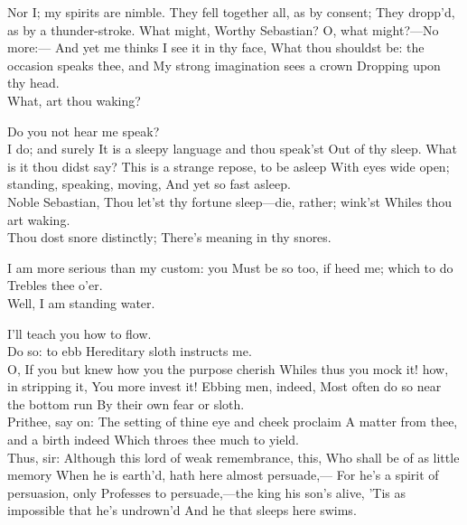\documentclass[11pt]{book}
\begin{document}
\7	Nor I; my spirits are nimble.
	They fell together all, as by consent;
	They dropp'd, as by a thunder-stroke. What might,
	Worthy Sebastian? O, what might?---No more:---
	And yet me thinks I see it in thy face,
	What thou shouldst be: the occasion speaks thee, and
	My strong imagination sees a crown
	Dropping upon thy head. \\

\8	What, art thou waking?

\7	Do you not hear me speak? \\

\8	I do; and surely
	It is a sleepy language and thou speak'st
	Out of thy sleep. What is it thou didst say?
	This is a strange repose, to be asleep
	With eyes wide open; standing, speaking, moving,
	And yet so fast asleep. \\

\7	Noble Sebastian,
	Thou let'st thy fortune sleep---die, rather; wink'st
	Whiles thou art waking. \\

\8	Thou dost snore distinctly;
	There's meaning in thy snores.

\7	I am more serious than my custom: you
	Must be so too, if heed me; which to do
	Trebles thee o'er. \\

\8	                  Well, I am standing water.

\7	I'll teach you how to flow. \\

\8	Do so: to ebb
	Hereditary sloth instructs me. \\

\7	O,
	If you but knew how you the purpose cherish
	Whiles thus you mock it! how, in stripping it,
	You more invest it! Ebbing men, indeed,
	Most often do so near the bottom run
	By their own fear or sloth.\\

\8	Prithee, say on:
	The setting of thine eye and cheek proclaim
	A matter from thee, and a birth indeed
	Which throes thee much to yield. \\

\7	Thus, sir:
	Although this lord of weak remembrance, this,
	Who shall be of as little memory
	When he is earth'd, hath here almost persuade,---
	For he's a spirit of persuasion, only
	Professes to persuade,---the king his son's alive,
	'Tis as impossible that he's undrown'd
	And he that sleeps here swims. \\
\end{document}
